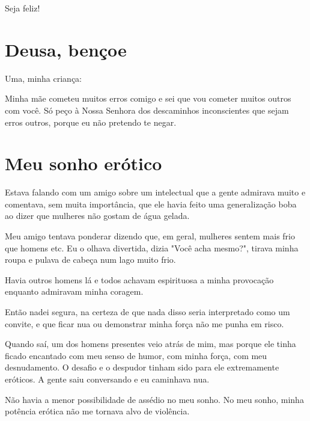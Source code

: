 Seja feliz!

\chapter{Deusa, bençoe}

Uma, minha criança:

Minha mãe cometeu muitos erros comigo e sei que vou cometer muitos
outros com você. Só peço à Nossa Senhora dos descaminhos inconscientes
que sejam erros outros, porque eu não pretendo te negar.

\chapter{Meu sonho erótico}

Estava falando com um amigo sobre um intelectual que a gente admirava
muito e comentava, sem muita importância, que ele havia feito uma
generalização boba ao dizer que mulheres não gostam de água gelada.

Meu amigo tentava ponderar dizendo que, em geral, mulheres sentem mais
frio que homens etc. Eu o olhava divertida, dizia "Você acha mesmo?",
tirava minha roupa e pulava de cabeça num lago muito frio.

Havia outros homens lá e todos achavam espirituosa a minha provocação
enquanto admiravam minha coragem.

Então nadei segura, na certeza de que nada disso seria interpretado como
um convite, e que ficar nua ou demonstrar minha força não me punha em
risco.

Quando saí, um dos homens presentes veio atrás de mim, mas porque ele
tinha ficado encantado com meu senso de humor, com minha força, com meu
desnudamento. O desafio e o despudor tinham sido para ele extremamente
eróticos. A gente saiu conversando e eu caminhava nua.

Não havia a menor possibilidade de assédio no meu sonho. No meu sonho,
minha potência erótica não me tornava alvo de violência.

